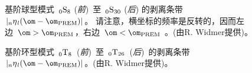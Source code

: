 \begin{figure}[!t]
\begin{center}
\end{center}
\caption[Ruedi 3]{
\label{fig:10.23}
基阶球型模式~${}_0{\rm S}_{8}$ ({\em 前\/})~至~${}_0{\rm S}_{30}$ ({\em 后\/}) 的剥离条带~$|{}_n\eta_{\hspace{0.3 mm}l}(\om-\om_{\rm PREM})|$。 请注意，横坐标的频率是反转的，因而左边~$\om>\om_{\rm PREM}$，右边~$\om<\om_{\rm PREM}$ 。(由R. Widmer提供)。}
\end{figure}
\begin{figure}[!b]
\begin{center}
\end{center}
\caption[Ruedi 2]{
\label{fig:10.22}
基阶环型模式~${}_0{\rm T}_{8}$~({\em 前\/})~至~${}_0{\rm T}_{26}$~({\em 后\/})~的剥离条带 ~$|{}_n\eta_{\hspace{0.3 mm}l}(\om-\om_{\rm PREM})|$。(由R. Widmer提供)。}
\end{figure}

